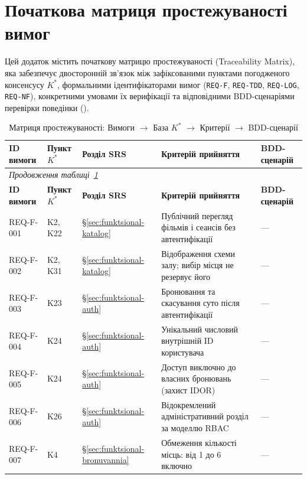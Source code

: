 \section{Початкова матриця простежуваності вимог}\label{sec:dodatok-matrytsia}

Цей додаток містить початкову матрицю простежуваності (Traceability Matrix), яка забезпечує двосторонній зв'язок між зафіксованими пунктами погодженого консенсусу $K^*$, формальними ідентифікаторами вимог (\texttt{REQ-F}, \texttt{REQ-TDD}, \texttt{REQ-LOG}, \texttt{REQ-NF}), конкретними умовами їх верифікації та відповідними BDD-сценаріями перевірки поведінки ().

\begin{small}
\setlength{\tabcolsep}{3.5pt}
\begin{longtable}{@{}p{2.2cm} p{1.4cm} p{1.6cm} p{7.4cm} p{2.4cm}@{}}
\caption{Матриця простежуваності: Вимоги $\rightarrow$ База $K^*$ $\rightarrow$ Критерії $\rightarrow$ BDD-сценарії}\label{tab:traceability}\\
\toprule
\textbf{ID вимоги} & \textbf{Пункт $K^*$} & \textbf{Розділ SRS} & \textbf{Критерій прийняття} & \textbf{BDD-сценарій} \\
\midrule
\endfirsthead
\multicolumn{5}{l}{\small\itshape Продовження таблиці~\ref{tab:traceability}}\\
\toprule
\textbf{ID вимоги} & \textbf{Пункт $K^*$} & \textbf{Розділ SRS} & \textbf{Критерій прийняття} & \textbf{BDD-сценарій} \\
\midrule
\endhead
\bottomrule
\endfoot
\bottomrule
\endlastfoot
REQ-F-001 & K2, K22 & \S\ref{sec:funktsional-katalog} & Публічний перегляд фільмів і сеансів без автентифікації & --- \\
REQ-F-002 & K2, K31 & \S\ref{sec:funktsional-katalog} & Відображення схеми залу; вибір місця не резервує його & --- \\
REQ-F-003 & K23 & \S\ref{sec:funktsional-auth} & Бронювання та скасування суто після автентифікації & --- \\
REQ-F-004 & K24 & \S\ref{sec:funktsional-auth} & Унікальний числовий внутрішній ID користувача & --- \\
REQ-F-005 & K24 & \S\ref{sec:funktsional-auth} & Доступ виключно до власних бронювань (захист IDOR) & --- \\
REQ-F-006 & K26 & \S\ref{sec:funktsional-auth} & Відокремлений адміністративний розділ за моделлю RBAC & --- \\
REQ-F-007 & K4 & \S\ref{sec:funktsional-bronuvannia} & Обмеження кількості місць: від 1 до 6 включно & --- \\

\end{longtable}
\end{small}
